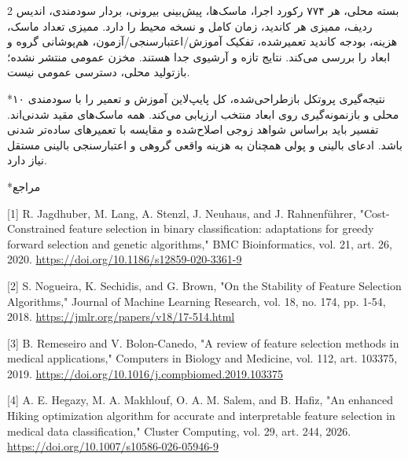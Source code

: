 \documentclass[10pt,a4paper]{article}
\makeatletter
\renewcommand{\section}{\@startsection{section}{1}{0pt}{5pt}{2pt}{\normalfont\normalsize\bfseries}}
\newcommand{\sect}[1]{\section*{#1}}
\makeatother
\begin{document}
\begin{multicols}{2}
بسته محلی، هر ۷۷۴ رکورد اجرا، ماسک‌ها، پیش‌بینی بیرونی، بردار سودمندی، اندیس ردیف، ممیزی هر کاندید، زمان کامل و نسخه محیط را دارد. ممیزی تعداد ماسک، هزینه، بودجه کاندید تعمیرشده، تفکیک آموزش/اعتبارسنجی/آزمون، هم‌پوشانی گروه و ابعاد  را بررسی می‌کند. نتایج تازه و آرشیوی جدا هستند. مخزن عمومی منتشر نشده؛ بازتولید محلی، دسترسی عمومی نیست.

\sect{۱۰  نتیجه‌گیری}
پروتکل بازطراحی‌شده، کل پایپ‌لاین آموزش و تعمیر را با سودمندی محلی و بازنمونه‌گیری روی ابعاد منتخب ارزیابی می‌کند. همه ماسک‌های مقید شدنی‌اند. تفسیر باید براساس شواهد زوجی اصلاح‌شده و مقایسه با تعمیرهای ساده‌تر شدنی باشد. ادعای بالینی و پولی همچنان به هزینه واقعی گروهی و اعتبارسنجی بالینی مستقل نیاز دارد.

\sect{مراجع}
\begin{minipage}{\linewidth}{\fontsize{7}{8.2}\selectfont \begin{latin}[1] R. Jagdhuber, M. Lang, A. Stenzl, J. Neuhaus, and J. Rahnenführer, "Cost-Constrained feature selection in binary classification: adaptations for greedy forward selection and genetic algorithms," BMC Bioinformatics, vol. 21, art. 26, 2020. \url{https://doi.org/10.1186/s12859-020-3361-9}\end{latin}\par}\end{minipage}\par
\begin{minipage}{\linewidth}{\fontsize{7}{8.2}\selectfont \begin{latin}[2] S. Nogueira, K. Sechidis, and G. Brown, "On the Stability of Feature Selection Algorithms," Journal of Machine Learning Research, vol. 18, no. 174, pp. 1-54, 2018. \url{https://jmlr.org/papers/v18/17-514.html}\end{latin}\par}\end{minipage}\par
\begin{minipage}{\linewidth}{\fontsize{7}{8.2}\selectfont \begin{latin}[3] B. Remeseiro and V. Bolon-Canedo, "A review of feature selection methods in medical applications," Computers in Biology and Medicine, vol. 112, art. 103375, 2019. \url{https://doi.org/10.1016/j.compbiomed.2019.103375}\end{latin}\par}\end{minipage}\par
\begin{minipage}{\linewidth}{\fontsize{7}{8.2}\selectfont \begin{latin}[4] A. E. Hegazy, M. A. Makhlouf, O. A. M. Salem, and B. Hafiz, "An enhanced Hiking optimization algorithm for accurate and interpretable feature selection in medical data classification," Cluster Computing, vol. 29, art. 244, 2026. \url{https://doi.org/10.1007/s10586-026-05946-9}\end{latin}\par}\end{minipage}\par

\end{multicols}
\end{document}
